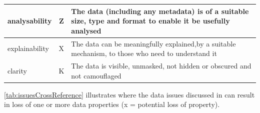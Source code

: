 \begin{longtable}{|L{}|C{}|L{}|}
	{\Gls{analysability}} & Z & {The data (including any \gls{metadata}) is of a suitable size, type and format to enable it be usefully analysed}\\\hline
	{\Gls{explainability}} & X & {The data can be meaningfully explained,by a suitable mechanism, to those who need to understand it}\\\hline
	{\Gls{clarity}} & K & {The data is visible, unmasked, not hidden or obscured and not camouflaged}\\\hline
\end{longtable}

\autoref{tab:issuesCrossReference} illustrates where the data issues discussed in
can result in
loss of one or more data properties (x = potential loss of property).

